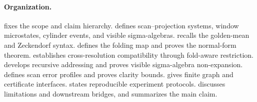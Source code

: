 \paragraph{Organization.}
 fixes the scope and claim hierarchy.   defines scan--projection systems, window microstates, cylinder events, and visible sigma-algebras.   recalls the golden-mean and Zeckendorf syntax.   defines the folding map and proves the normal-form theorem.   establishes cross-resolution compatibility through fold-aware restriction.   develops recursive addressing and proves visible sigma-algebra non-expansion.   defines scan error profiles and proves clarity bounds.   gives finite graph and certificate interfaces.   states reproducible experiment protocols.   discusses limitations and downstream bridges, and  summarizes the main claim.
